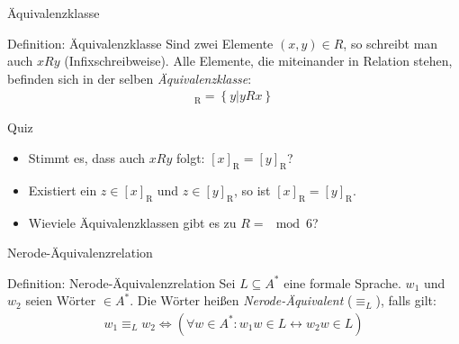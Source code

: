 \begin{frame}{Äquivalenzklasse}
    \begin{block}{Definition: Äquivalenzklasse}
        Sind zwei Elemente $\left( x,y \right)\in R$, so schreibt man auch $xRy$ (Infixschreibweise). Alle Elemente, die miteinander in Relation stehen, befinden sich in der selben \emph{Äquivalenzklasse}:
        \begin{align*}
            [x]_\mathrm{R} = \left\{ y | yRx \right\}
        \end{align*}
    \end{block}
\end{frame}
\begin{frame}{Quiz}
    \begin{itemize}
        \item Stimmt es, dass auch $xRy$ folgt: $[x]_\mathrm{R} = [y]_{\mathrm{R}}$? 
        \item Existiert ein $z\in \left[ x \right]_\mathrm{R}$ und $z\in\left[ y \right]_\mathrm{R}$, so ist $\left[ x \right]_\mathrm{R} = \left[ y \right]_\mathrm{R}$. 
        \item Wieviele Äquivalenzklassen gibt es zu $R = \mod 6$? 
    \end{itemize}
\end{frame}
\begin{frame}{Nerode-Äquivalenzrelation}
    \begin{block}{Definition: Nerode-Äquivalenzrelation}
        Sei $L\subseteq A^*$ eine formale Sprache. $w_1$ und $w_2$ seien Wörter $\in A^*$. Die Wörter heißen \emph{Nerode-Äquivalent} ($\equiv_L$), falls gilt:
        \begin{align*}
            w_1 \equiv_L w_2 \Leftrightarrow \left( \forall w \in A^*: w_1 w\in L \leftrightarrow w_2 w\in L \right)
        \end{align*}
    \end{block}
\end{frame}
